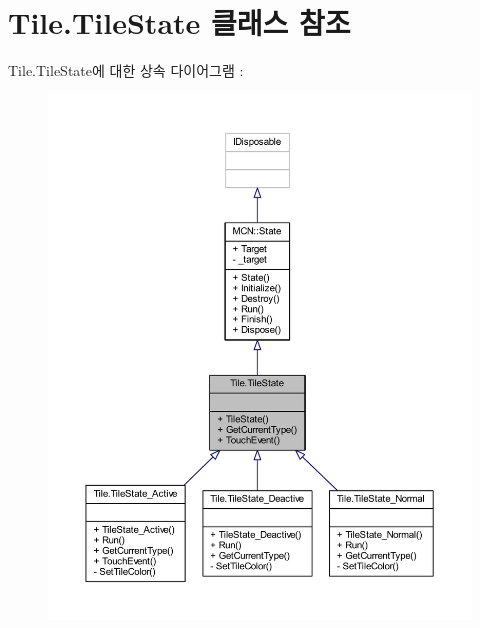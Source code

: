 \hypertarget{class_tile_1_1_tile_state}{}\section{Tile.\+Tile\+State 클래스 참조}
\label{class_tile_1_1_tile_state}


Tile.\+Tile\+State에 대한 상속 다이어그램 \+: \nopagebreak
\begin{figure}[H]
\begin{center}
\leavevmode
\includegraphics[width=350pt]{class_tile_1_1_tile_state__inherit__graph}
\end{center}
\end{figure}


